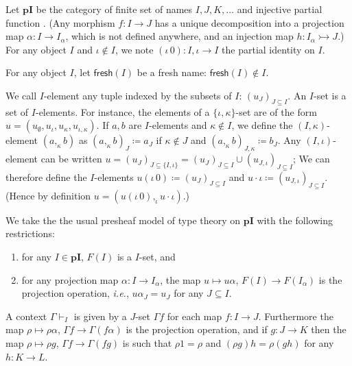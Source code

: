 \documentclass[english]{PaperTools/latex/lipics}
\def\pI{\ensuremath{\mathbf{pI}}}
\def\fresh#1{\mathsf{fresh}(#1)}
\def\ie{\textit{i.e.}}
\begin{document}
\begin{definition}
  Let \pI{} be the category of finite set of names $I,J,K,…$ and injective
  partial function \cite[ex.~9.7 p.~176]{PittsAM:nomsns}.
  (Any morphism $f : I → J$ has a unique decomposition into a projection map
  $α : I → I_α$, which is not defined anywhere, and an injection map $h : I_α ↣ J$.)
  For any object $I$ and $ι ∉ I$, we note $(ι \, 0) : I,ι → I$ the partial
  identity on $I$.


  For any object $I$, let $\fresh{I}$ be a fresh name: $\fresh{I} ∉ I$.
\end{definition}

\begin{definition}
  We call $I$-element any tuple indexed by the subsets of $I$: $(u_J)_{J ⊆ I}$.
  An $I$-set is a set of $I$-elements.  For instance, the elements of a
  $\{ι,κ\}$-set are of the form $u = (u_∅,u_ι,u_κ,u_{ι,κ})$.
  If $a,b$ are $I$-elements and $κ ∉ I$, we define the $(I,κ)$-element
  $(a ,_κ b)$ as $(a ,_κ b)_J ≔ a_J$ if $κ ∉ J$ and $(a ,_κ b)_{J,κ} ≔ b_J$.
  Any $(I,ι)$-element can be written $u = (u_J)_{J ⊆ \{I,ι\}} = (u_J)_{J ⊆ I} ∪ (u_{J,ι})_{J ⊆ I}$;
  We can therefore define the $I$-elements $u (ι\,0) ≔ (u_J)_{J ⊆ I}$ and $u · ι ≔ (u_{J,ι})_{J ⊆ I}$.
  (Hence by definition $u = (u (ι\,0) ,_ι u · ι)$.)
\end{definition}

\bigskip
We take the the usual presheaf model of type theory on \pI{} with the
following restrictions:
\begin{enumerate}
  \item for any $I ∈ \pI$, $F(I)$ is a $I$-set, and
  \item for any projection map $α : I → I_α$, the
    map $u ↦ uα$, $F(I) → F(I_α)$ is the projection operation, \ie,
    $uα_J = u_J$ for any $J ⊆ I$.
\end{enumerate}

\bigskip
A context $Γ ⊢_I$ is given by a $J$-set $Γf$ for each map $f : I → J$.
Furthermore the map $ρ ↦ ρα$, $Γf → Γ(fα)$ is the projection operation,
and if $g : J → K$ then the map $ρ ↦ ρg$, $Γf → Γ(fg)$ is such that
$ρ1 = ρ$ and $(ρg)h = ρ(gh)$ for any $h : K → L$.
\end{document}

